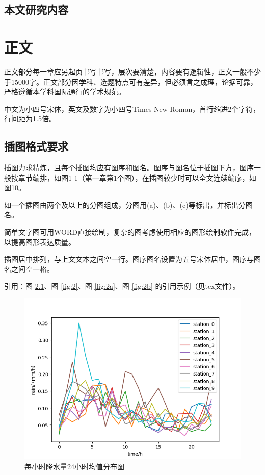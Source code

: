 \documentclass{seuthesis-2022}
\begin{document}
\section{本文研究内容}

\chapter{正文}
正文部分每一章应另起页书写书写，层次要清楚，内容要有逻辑性，正文一般不少于15000字。正文部分因学科、选题特点可有差异，但必须言之成理，论据可靠，严格遵循本学科国际通行的学术规范。

中文为小四号宋体，英文及数字为小四号Times New Roman，首行缩进2个字符，行间距为1.5倍。

\section{插图格式要求}
插图力求精炼，且每个插图均应有图序和图名。图序与图名位于插图下方，图序一般按章节编排，如图1-1（第一章第1个图），在插图较少时可以全文连续编序，如图10。

如一个插图由两个及以上的分图组成，分图用(a)、(b)、(c)等标出，并标出分图名。

简单文字图可用WORD直接绘制，复杂的图考虑使用相应的图形绘制软件完成，以提高图形表达质量。

插图居中排列，与上文文本之间空一行。图序图名设置为五号宋体居中，图序与图名之间空一格。

引用：图 \ref{fig:1}、图 \ref{fig:2}、图 \ref{fig:2a}、图 \ref{fig:2b} 的引用示例（见tex文件）。

\begin{figure}[H]
    \centering
    \includegraphics[width=0.5\linewidth]{fig/降水量均值分布图.png}
    \caption{每小时降水量24小时均值分布图}
    \label{fig:1}
\end{figure}
\end{document}

